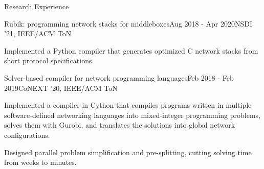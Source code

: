 \documentclass[
]{resume} %
\begin{document}
\begin{rSection}{Research Experience}
    \begin{rSubsection}{Rubik: programming network stacks for middleboxes}{Aug 2018 - Apr 2020}{NSDI '21, IEEE/ACM ToN}{}
        \item Implemented a Python compiler that generates optimized C network stacks from short protocol specifications.
    \end{rSubsection}

    \begin{rSubsection}{Solver-based compiler for network programming languages}{Feb 2018 - Feb 2019}{CoNEXT '20, IEEE/ACM ToN}{}
        \item Implemented a compiler in Cython that compiles programs written in multiple software-defined networking languages into mixed-integer programming problems, solves them with Gurobi, and translates the solutions into global network configurations.
        \item Designed parallel problem simplification and pre-splitting, cutting solving time from weeks to minutes.
    \end{rSubsection}
\end{rSection}
\end{document}
